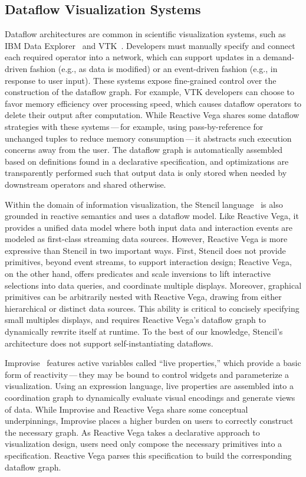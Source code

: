 \subsection{Dataflow Visualization Systems}

Dataflow architectures are common in scientific visualization systems, such as
IBM Data Explorer~\cite{lucas:dataflow,abram:ibmdx} and
VTK~\cite{schroeder:vtk}. Developers must manually specify and connect each
required operator into a network, which can support updates in a demand-driven
fashion (e.g., as data is modified) or an event-driven fashion (e.g., in
response to user input). These systems expose fine-grained control over the
construction of the dataflow graph. For example, VTK developers can choose to
favor memory efficiency over processing speed, which causes dataflow operators
to delete their output after computation. While Reactive Vega shares some
dataflow strategies with these systems\,---\,for example, using
pass-by-reference for unchanged tuples to reduce memory consumption\,---\,it
abstracts such execution concerns away from the user. The dataflow graph is
automatically assembled based on definitions found in a declarative
specification, and optimizations are transparently performed such that output
data is only stored when needed by downstream operators and shared otherwise.

Within the domain of information visualization, the Stencil
language~\cite{cottam:stencil} is also grounded in reactive semantics and uses a
dataflow model. Like Reactive Vega, it provides a unified data model where both
input data and interaction events are modeled as first-class streaming data
sources. However, Reactive Vega is more expressive than Stencil in two important
ways. First, Stencil does not provide primitives, beyond event streams, to
support interaction design; Reactive Vega, on the other hand, offers predicates
and scale inversions to lift interactive selections into data queries, and
coordinate multiple displays. Moreover, graphical primitives can be arbitrarily
nested with Reactive Vega, drawing from either hierarchical or distinct data
sources. This ability is critical to concisely specifying small multiples
displays, and requires Reactive Vega's dataflow graph to dynamically rewrite
itself at runtime. To the best of our knowledge, Stencil's architecture does not
support self-instantiating dataflows.

Improvise~\cite{weaver:improvise} features active variables called ``live
properties,'' which provide a basic form of reactivity\,---\,they may be bound
to control widgets and parameterize a visualization. Using an expression
language, live properties are assembled into a coordination graph to dynamically
evaluate visual encodings and generate views of data. While Improvise and
Reactive Vega share some conceptual underpinnings, Improvise places a higher
burden on users to correctly construct the necessary graph. As Reactive Vega
takes a declarative approach to visualization design, users need only compose
the necessary primitives into a specification. Reactive Vega parses this
specification to build the corresponding dataflow graph.

